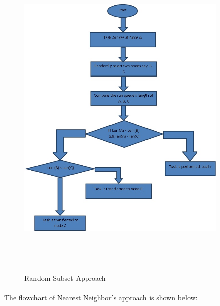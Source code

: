 \documentclass[12pt]{article}
\begin{document}
\paragraph{}
\begin{figure}[h!]
  \centering
    \includegraphics[width=10cm, height=16cm]{fig_2.jpg}
    \centering
    \caption{Random Subset Approach }
\end{figure}
\clearpage
\paragraph{}
The flowchart of Nearest Neighbor’s approach is shown below:
\end{document}
